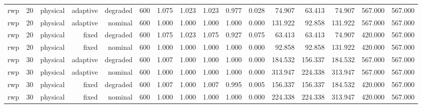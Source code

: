 \begin{tabular}{lrrrrrrrrrrrrrrr}
rwp & 20 & physical & adaptive & degraded & 600 & 1.075 & 1.023 & 1.023 & 0.977 & 0.028 & 74.907 & 63.413 & 74.907 & 567.000 & 567.000 \\
rwp & 20 & physical & adaptive & nominal & 600 & 1.000 & 1.000 & 1.000 & 1.000 & 0.000 & 131.922 & 92.858 & 131.922 & 567.000 & 567.000 \\
rwp & 20 & physical & fixed & degraded & 600 & 1.075 & 1.023 & 1.075 & 0.927 & 0.075 & 63.413 & 63.413 & 74.907 & 420.000 & 567.000 \\
rwp & 20 & physical & fixed & nominal & 600 & 1.000 & 1.000 & 1.000 & 1.000 & 0.000 & 92.858 & 92.858 & 131.922 & 420.000 & 567.000 \\
rwp & 30 & physical & adaptive & degraded & 600 & 1.007 & 1.000 & 1.000 & 1.000 & 0.000 & 184.532 & 156.337 & 184.532 & 567.000 & 567.000 \\
rwp & 30 & physical & adaptive & nominal & 600 & 1.000 & 1.000 & 1.000 & 1.000 & 0.000 & 313.947 & 224.338 & 313.947 & 567.000 & 567.000 \\
rwp & 30 & physical & fixed & degraded & 600 & 1.007 & 1.000 & 1.007 & 0.995 & 0.005 & 156.337 & 156.337 & 184.532 & 420.000 & 567.000 \\
rwp & 30 & physical & fixed & nominal & 600 & 1.000 & 1.000 & 1.000 & 1.000 & 0.000 & 224.338 & 224.338 & 313.947 & 420.000 & 567.000 \\
\bottomrule
\end{tabular}